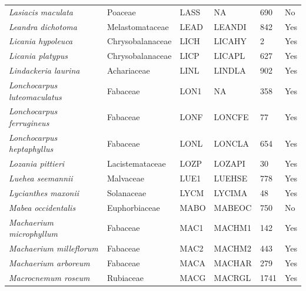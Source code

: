 \documentclass[11pt]{article}
\begin{document}
\begin{longtable}{@{}llllll@{}}
\textit{Lasiacis maculata}                            & Poaceae          & LASS   & NA     & 690             & No        \\
\textit{Leandra dichotoma}                            & Melastomataceae  & LEAD   & LEANDI & 842             & Yes       \\
\textit{Licania hypoleuca}                            & Chrysobalanaceae & LICH   & LICAHY & 2               & Yes       \\
\textit{Licania platypus}                             & Chrysobalanaceae & LICP   & LICAPL & 627             & Yes       \\
\textit{Lindackeria laurina}                          & Achariaceae      & LINL   & LINDLA & 902             & Yes       \\
\textit{Lonchocarpus luteomaculatus}                  & Fabaceae         & LON1   & NA     & 358             & Yes       \\
\textit{Lonchocarpus ferrugineus}                     & Fabaceae         & LONF   & LONCFE & 77              & Yes       \\
\textit{Lonchocarpus heptaphyllus}                    & Fabaceae         & LONL   & LONCLA & 654             & Yes       \\
\textit{Lozania pittieri}                             & Lacistemataceae  & LOZP   & LOZAPI & 30              & Yes       \\
\textit{Luehea seemannii}                             & Malvaceae        & LUE1   & LUEHSE & 778             & Yes       \\
\textit{Lycianthes maxonii}                           & Solanaceae       & LYCM   & LYCIMA & 48              & Yes       \\
\textit{Mabea occidentalis}                           & Euphorbiaceae    & MABO   & MABEOC & 750             & No        \\
\textit{Machaerium microphyllum}                      & Fabaceae         & MAC1   & MACHM1 & 142             & Yes       \\
\textit{Machaerium milleflorum}                       & Fabaceae         & MAC2   & MACHM2 & 443             & Yes       \\
\textit{Machaerium arboreum}                          & Fabaceae         & MACA   & MACHAR & 279             & Yes       \\
\textit{Macrocnemum roseum}                           & Rubiaceae        & MACG   & MACRGL & 1741            & Yes       \\

\end{longtable}
\end{document}
